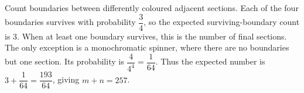 Count boundaries between differently coloured adjacent sections. Each of the four boundaries survives with probability $\dfrac{3}{4}$, so the expected surviving-boundary count is $3$. When at least one boundary survives, this is the number of final sections. The only exception is a monochromatic spinner, where there are no boundaries but one section. Its probability is $\dfrac{4}{4^4}=\dfrac{1}{64}$. Thus the expected number is $3+\dfrac{1}{64}=\dfrac{193}{64}$, giving $\boxed{m+n=257}$.

